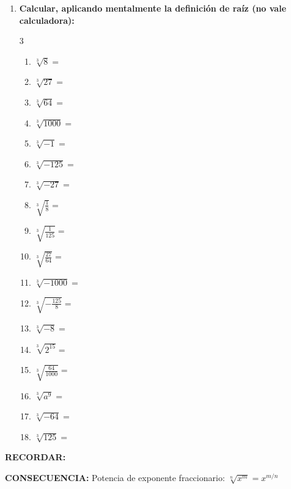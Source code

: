 \documentclass[10pt, a4paper]{article}
\newenvironment{boxsummary}{%
  \def\FrameCommand{\fcolorbox{black}{graybox}}%
  \MakeFramed{\FrameRestore}%
  \small\textbf{RECORDAR:}\par\smallskip
}{%
  \endMakeFramed
}
\begin{document}
\begin{enumerate}
    \item \textbf{Calcular, aplicando mentalmente la definición de raíz (no vale calculadora):}
    \begin{multicol}{3}
    \begin{enumerate}[label=\alph*)]
        \item $\sqrt[3]{8} =$
        \item $\sqrt[3]{27} =$
        \item $\sqrt[3]{64} =$
        \item $\sqrt[3]{1000} =$
        \item $\sqrt[3]{-1} =$
        \item $\sqrt[3]{-125} =$
        \item $\sqrt[3]{-27} =$
        \item $\sqrt[3]{\frac{1}{8}} =$
        \item $\sqrt[3]{\frac{1}{125}} =$
        \item $\sqrt[3]{\frac{27}{64}} =$
        \item $\sqrt[3]{-1000} =$
        \item $\sqrt[3]{-\frac{125}{8}} =$
        \item $\sqrt[3]{-8} =$
        \item $\sqrt[3]{2^{15}} =$
        \item $\sqrt[3]{\frac{64}{1000}} =$
        \item $\sqrt[3]{a^9} =$
        \item $\sqrt[3]{-64} =$
        \item $\sqrt[3]{125} =$
    \end{enumerate}
    \end{multicol}
\end{enumerate}

\begin{boxsummary}
\textbf{CONSECUENCIA:} Potencia de exponente fraccionario: $\sqrt[n]{x^m} = x^{m/n}$
\end{boxsummary}
\end{document}
